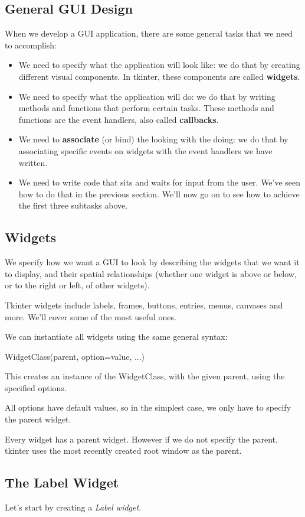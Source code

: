 \documentclass{article}
\begin{document}
\subsection{General GUI Design}
When we develop a GUI application, there are some general tasks that we need to accomplish:
\begin{itemize}
\item We need to specify what the application will look like: 
we do that by creating different visual components.  In tkinter, these components are called \textbf{widgets}.
\item We need to specify what the application will do: we do that by writing methods and functions that perform certain tasks.  These methods and functions are the event handlers, also called \textbf{callbacks}.
\item We need to \textbf{associate} (or bind) the looking with the doing: we do that by associating specific events on widgets with the event handlers we have written.
\item We need to write code that sits and waits for input from the user.  We've seen how to do that in the previous section.
We'll now go on to see how to achieve the first three subtasks above.
\end{itemize}

\subsection{Widgets}
We specify how we want a GUI to look by describing the widgets that we want it to display, and their spatial relationships (whether one widget is above or below, or to the right or left, of other widgets). 

Tkinter widgets include labels, frames, buttons, entries, menus, canvases and more.  We’ll cover some of the most useful ones.  

We can instantiate all widgets using the same general syntax:

WidgetClass(parent, option=value, ...)

This creates an instance of the WidgetClass, with the given parent, using the specified options.

All options have default values, so in the simplest case, we only have to specify the parent widget.  

Every widget has a parent widget.   However if we do not specify the parent,  tkinter uses the most recently created root window as the parent.

\subsection{The Label Widget}
Let's start by creating a \textit{Label widget}.
\end{document}
